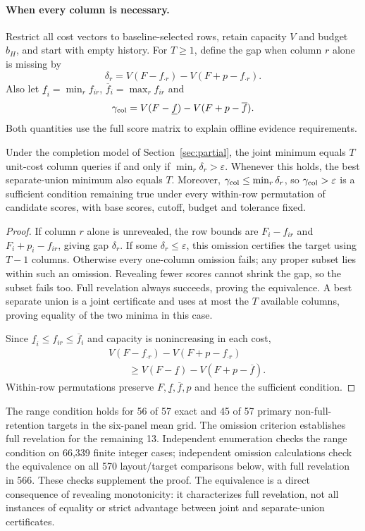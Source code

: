 \paragraph{When every column is necessary.}
Restrict all cost vectors to baseline-selected rows, retain capacity $V$ and budget $b_H$, and start with empty history. For $T\ge1$, define the gap when column $r$ alone is missing by
\[
 \delta_r=V(F-f_{\cdot r})-V(F+p-f_{\cdot r}).
\]
Also let $\underline f_i=\min_r f_{ir}$, $\overline f_i=\max_r f_{ir}$ and
\[
 \gamma_{\rm col}=V(F-\underline f)-V(F+p-\overline f).
\]
Both quantities use the full score matrix to explain offline evidence requirements.
\begin{proposition}
\label{prop:all-columns}
Under the completion model of Section~\ref{sec:partial}, the joint minimum equals $T$ unit-cost column queries if and only if $\min_r\delta_r>\varepsilon$. Whenever this holds, the best separate-union minimum also equals $T$. Moreover, $\gamma_{\rm col}\le\min_r\delta_r$, so $\gamma_{\rm col}>\varepsilon$ is a sufficient condition remaining true under every within-row permutation of candidate scores, with base scores, cutoff, budget and tolerance fixed.
\end{proposition}
\begin{proof}
If column $r$ alone is unrevealed, the row bounds are $F_i-f_{ir}$ and $F_i+p_i-f_{ir}$, giving gap $\delta_r$. If some $\delta_r\le\varepsilon$, this omission certifies the target using $T-1$ columns. Otherwise every one-column omission fails; any proper subset lies within such an omission. Revealing fewer scores cannot shrink the gap, so the subset fails too. Full revelation always succeeds, proving the equivalence. A best separate union is a joint certificate and uses at most the $T$ available columns, proving equality of the two minima in this case.

Since $\underline f_i\le f_{ir}\le\overline f_i$ and capacity is nonincreasing in each cost,
\[
 \begin{aligned}
 &V(F-f_{\cdot r})-V(F+p-f_{\cdot r})\\
 &\qquad\ge V(F-\underline f)-V(F+p-\overline f).
 \end{aligned}
\]
Within-row permutations preserve $F,\underline f,\overline f,p$ and hence the sufficient condition.
\end{proof}

The range condition holds for 56 of 57 exact and 45 of 57 primary non-full-retention targets in the six-panel mean grid. The omission criterion establishes full revelation for the remaining 13. Independent enumeration checks the range condition on 66,339 finite integer cases; independent omission calculations check the equivalence on all 570 layout/target comparisons below, with full revelation in 566. These checks supplement the proof. The equivalence is a direct consequence of revealing monotonicity: it characterizes full revelation, not all instances of equality or strict advantage between joint and separate-union certificates.

